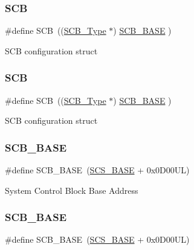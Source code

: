 \subsubsection{\texorpdfstring{SCB}{SCB}\hspace{0.1cm}{\footnotesize\ttfamily [5/6]}}
{\footnotesize\ttfamily \#define S\+CB~((\mbox{\hyperlink{struct_s_c_b___type}{S\+C\+B\+\_\+\+Type}}       $\ast$)     \mbox{\hyperlink{group___c_m_s_i_s__core__base_gad55a7ddb8d4b2398b0c1cfec76c0d9fd}{S\+C\+B\+\_\+\+B\+A\+SE}}      )}

S\+CB configuration struct \mbox{\label{group___c_m_s_i_s__core__base_gaaaf6477c2bde2f00f99e3c2fd1060b01}} 
\subsubsection{\texorpdfstring{SCB}{SCB}\hspace{0.1cm}{\footnotesize\ttfamily [6/6]}}
{\footnotesize\ttfamily \#define S\+CB~((\mbox{\hyperlink{struct_s_c_b___type}{S\+C\+B\+\_\+\+Type}}       $\ast$)     \mbox{\hyperlink{group___c_m_s_i_s__core__base_gad55a7ddb8d4b2398b0c1cfec76c0d9fd}{S\+C\+B\+\_\+\+B\+A\+SE}}      )}

S\+CB configuration struct \mbox{\label{group___c_m_s_i_s__core__base_gad55a7ddb8d4b2398b0c1cfec76c0d9fd}} 
\subsubsection{\texorpdfstring{SCB\_BASE}{SCB\_BASE}\hspace{0.1cm}{\footnotesize\ttfamily [1/6]}}
{\footnotesize\ttfamily \#define S\+C\+B\+\_\+\+B\+A\+SE~(\mbox{\hyperlink{group___c_m_s_i_s__core__base_ga3c14ed93192c8d9143322bbf77ebf770}{S\+C\+S\+\_\+\+B\+A\+SE}} +  0x0\+D00\+U\+L)}

System Control Block Base Address \mbox{\label{group___c_m_s_i_s__core__base_gad55a7ddb8d4b2398b0c1cfec76c0d9fd}} 
\subsubsection{\texorpdfstring{SCB\_BASE}{SCB\_BASE}\hspace{0.1cm}{\footnotesize\ttfamily [2/6]}}
{\footnotesize\ttfamily \#define S\+C\+B\+\_\+\+B\+A\+SE~(\mbox{\hyperlink{group___c_m_s_i_s__core__base_ga3c14ed93192c8d9143322bbf77ebf770}{S\+C\+S\+\_\+\+B\+A\+SE}} +  0x0\+D00\+U\+L)}

